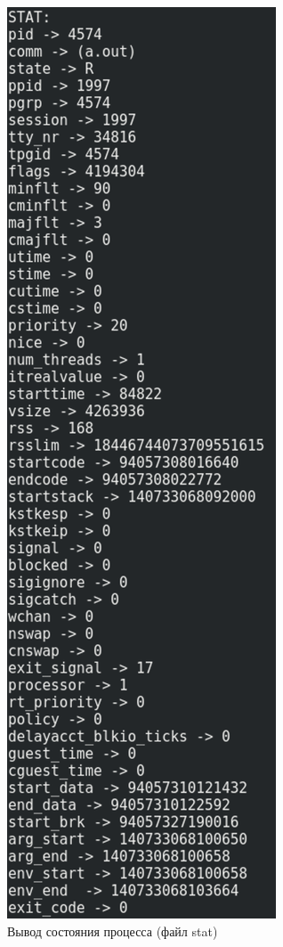 \begin{figure}[H]
    \centering
    \includegraphics[scale=0.7]{img/part_01/stat.png}
    \caption{Вывод состояния процесса (файл {\ttfamily stat})}
\end{figure}
